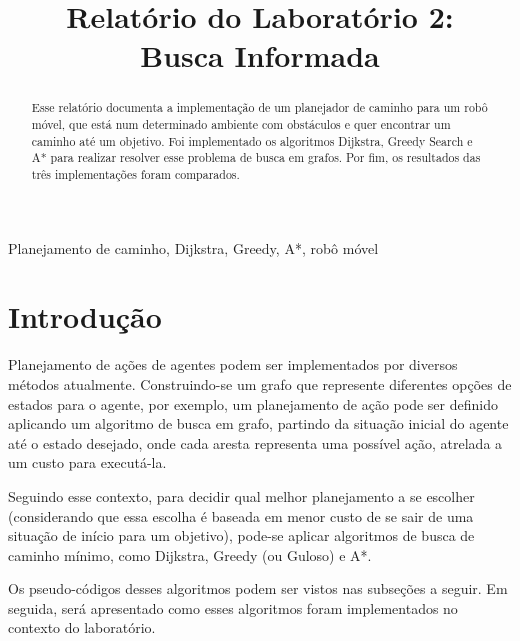 \documentclass[conference]{IEEEtran}
\begin{document}
\title{Relatório do Laboratório 2: \\ Busca Informada\\
}

\author{
}

\maketitle

\begin{abstract}
Esse relatório documenta a implementação de um planejador de caminho para um robô móvel, que está num determinado ambiente com obstáculos e quer encontrar um caminho até um objetivo. Foi implementado os algoritmos Dijkstra, Greedy Search e A* para realizar resolver esse problema de busca em grafos. Por fim, os resultados das três implementações foram comparados.
\end{abstract}

\begin{IEEEkeywords}
Planejamento de caminho, Dijkstra, Greedy, A*, robô móvel
\end{IEEEkeywords}

\section{Introdução}
Planejamento de ações de agentes podem ser implementados por diversos métodos atualmente. Construindo-se um grafo que represente diferentes opções de estados para o agente, por exemplo, um planejamento de ação pode ser definido aplicando um algoritmo de busca em grafo, partindo da situação inicial do agente até o estado desejado, onde cada aresta representa uma possível ação, atrelada a um custo para executá-la.

Seguindo esse contexto, para decidir qual melhor planejamento a se escolher (considerando que essa escolha é baseada em menor custo de se sair de uma situação de início para um objetivo), pode-se aplicar algoritmos de busca de caminho mínimo, como Dijkstra, Greedy (ou Guloso) e A*. 

Os pseudo-códigos desses algoritmos podem ser vistos nas subseções a seguir. Em seguida, será apresentado como esses algoritmos foram implementados no contexto do laboratório.
\end{document}
